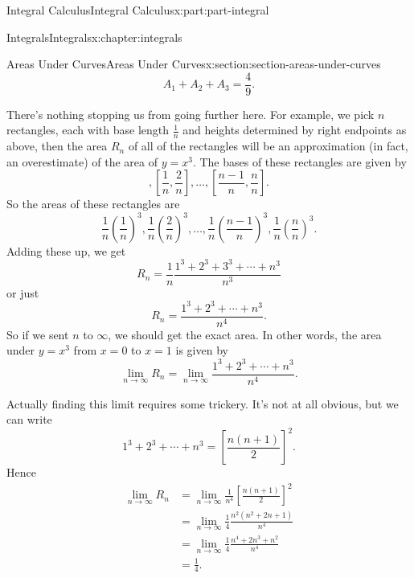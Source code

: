 \documentclass[twoside,10pt,]{tufte-book}
\numberwithin{equation}{part}
\begin{document}
\begin{partptx}{Integral Calculus}{}{Integral Calculus}{}{}{x:part:part-integral}
\begin{chapterptx}{Integrals}{}{Integrals}{}{}{x:chapter:integrals}
\begin{sectionptx}{Areas Under Curves}{}{Areas Under Curves}{}{}{x:section:section-areas-under-curves}
\begin{equation*}
A_{1} + A_{2} + A_{3} = \frac{4}{9}.
\end{equation*}
%
\par
There's nothing stopping us from going further here. For example, we pick \(n\) rectangles, each with base length \(\frac{1}{n}\) and heights determined by right endpoints as above, then the area \(R_{n}\) of all of the rectangles will be an approximation (in fact, an overestimate) of the area of \(y = x^{3}\). The bases of these rectangles are given by%
\begin{equation*}
[0,\frac{1}{n}], [\frac{1}{n},\frac{2}{n}],\ldots,[\frac{n-1}{n},\frac{n}{n}].
\end{equation*}
So the areas of these rectangles are%
\begin{equation*}
\frac{1}{n}\left(\frac{1}{n}\right)^{3}, \frac{1}{n}\left(\frac{2}{n}\right)^{3},\ldots,\frac{1}{n}\left(\frac{n-1}{n}\right)^{3}, \frac{1}{n}\left(\frac{n}{n}\right)^{3}.
\end{equation*}
Adding these up, we get%
\begin{equation*}
R_{n} = \frac{1}{n}\frac{1^{3}+2^{3} + 3^{3} + \cdots + n^{3}}{n^{3}}
\end{equation*}
or just%
\begin{equation*}
R_{n} = \frac{1^{3} + 2^{3} + \cdots + n^{3}}{n^{4}}.
\end{equation*}
So if we sent \(n\) to \(\infty\), we should get the exact area. In other words, the area under \(y=x^{3}\) from \(x=0\) to \(x=1\) is given by%
\begin{equation*}
\lim_{n\to\infty}R_{n} = \lim_{n\to\infty}\frac{1^{3} + 2^{3} + \cdots + n^{3}}{n^{4}}.
\end{equation*}
%
\par
Actually finding this limit requires some trickery. It's not at all obvious, but we can write%
\begin{equation*}
1^{3} + 2^{3} + \cdots + n^{3} = \left[\frac{n(n+1)}{2}\right]^{2}.
\end{equation*}
Hence%
\begin{align*}
\lim_{n\to\infty}R_{n} & = \lim_{n\to\infty}\frac{1}{n^{4}}\left[\frac{n(n+1)}{2}\right]^{2} \\
& = \lim_{n\to\infty}\frac{1}{4}\frac{n^{2}(n^{2}+2n+1)}{n^{4}} \\
& = \lim_{n\to\infty}\frac{1}{4}\frac{n^{4} + 2n^{3} + n^{2}}{n^{4}} \\
& = \frac{1}{4}. 
\end{align*}

\end{sectionptx}
\end{chapterptx}
\end{partptx}
\end{document}
